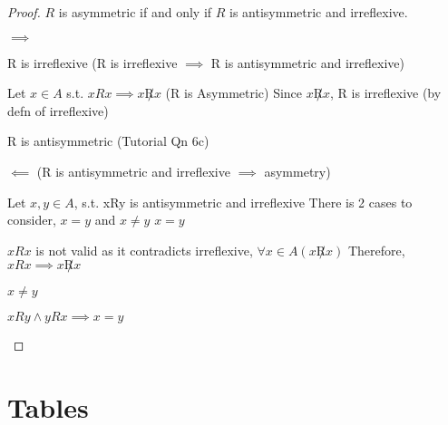 \documentclass[a4paper]{article}
\theoremstyle{definition}
\begin{document}
\begin{proof} $R$ is asymmetric if and only if $R$ is antisymmetric and irreflexive.
  \begin{numpf}
  \pfln $\implies$
  \begin{subpf}
    \pfln R is irreflexive (R is irreflexive $\implies$ R is antisymmetric and irreflexive)
    \begin{subpf}
      \pfln Let $x \in A$ s.t. $xRx \implies x \not R x$ (R is Asymmetric)
      \pfln Since $x\not R x$, R is irreflexive (by defn of irreflexive)
    \end{subpf}
  \end{subpf}
  \begin{subpf}
    \pfln R is antisymmetric (Tutorial Qn 6c)
  \end{subpf}
  \pfln $\impliedby$ (R is antisymmetric and irreflexive $\implies$ asymmetry)
  \begin{subpf}
    \pfln Let $x, y \in A$, s.t. xRy is antisymmetric and irreflexive
    \pfln There is 2 cases to consider, $x = y$ and $x \not = y$
    \pfln $x = y$
    \begin{subpf}
      \pfln $xRx$ is not valid as it contradicts irreflexive, $\forall x \in A(x\not R x)$
      \pfln Therefore, $xRx \implies x\not R x$
    \end{subpf}
    \pfln $x \not = y$
    \begin{subpf}
      \pfln $xRy \land yRx \implies x = y$
    \end{subpf}
  \end{subpf}
  \end{numpf}
\end{proof}


\pagebreak

\section{Tables}
\end{document}
